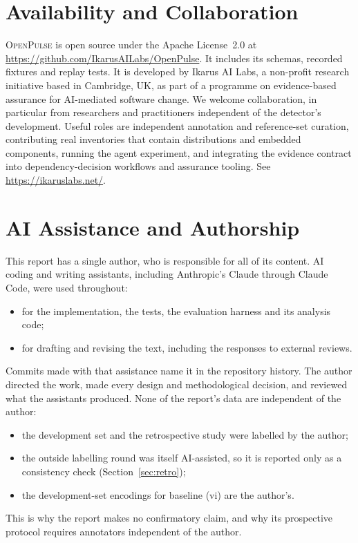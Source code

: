 \documentclass[11pt,a4paper]{article}
\newcommand{\op}{\textsc{OpenPulse}}
\begin{document}
\section*{Availability and Collaboration}
\op{} is open source under the Apache License~2.0 at
\url{https://github.com/IkarusAILabs/OpenPulse}. It includes its
schemas, recorded fixtures and replay tests. It is developed by Ikarus
AI Labs, a non-profit research initiative based in Cambridge, UK, as
part of a programme on evidence-based assurance for AI-mediated
software change. We welcome collaboration, in particular from
researchers and practitioners independent of the detector's
development. Useful roles are independent annotation and reference-set
curation, contributing real inventories that contain distributions and
embedded components, running the agent experiment, and integrating the
evidence contract into dependency-decision workflows and assurance
tooling. See \url{https://ikaruslabs.net/}.

\section*{AI Assistance and Authorship}
This report has a single author, who is responsible for all of its
content. AI coding and writing assistants, including Anthropic's
Claude through Claude Code, were used throughout:
\begin{itemize}[leftmargin=*,nosep]
  \item for the implementation, the tests, the evaluation harness and
    its analysis code;
  \item for drafting and revising the text, including the responses to
    external reviews.
\end{itemize}
Commits made with that assistance name it in the repository history.
The author directed the work, made every design and methodological
decision, and reviewed what the assistants produced. None of the
report's data are independent of the author:
\begin{itemize}[leftmargin=*,nosep]
  \item the development set and the retrospective study were labelled
    by the author;
  \item the outside labelling round was itself AI-assisted, so it is
    reported only as a consistency check (Section~\ref{sec:retro});
  \item the development-set encodings for baseline (vi) are the
    author's.
\end{itemize}
This is why the report makes no confirmatory claim, and why its
prospective protocol requires annotators independent of the author.
\end{document}
